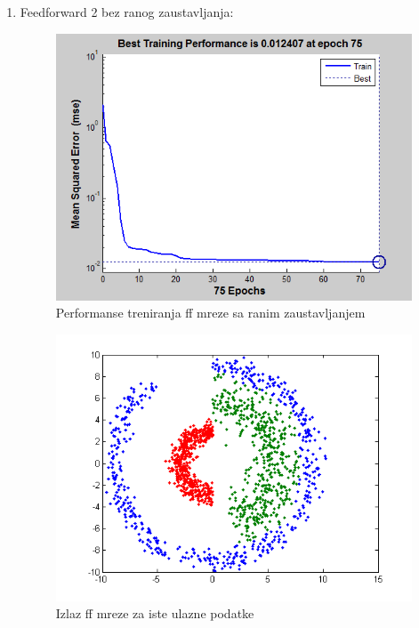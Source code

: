 \documentclass{report}
\begin{document}
\begin{enumerate}
\begin{enumerate}
\newpage
\item\LARGE
Feedforward 2 bez ranog zaustavljanja:\large

\begin{figure}[!h]
\begin{center}
\includegraphics[scale=0.8]{B1performanceFF2.png}
\caption{Performanse treniranja ff mreze sa ranim zaustavljanjem}
\end{center}
\end{figure}

\begin{figure}[!h]
\begin{center}
\includegraphics[scale=0.8]{B1outputFF2Same.png}
\caption{Izlaz ff mreze za iste ulazne podatke}
\end{center}
\end{figure}


\end{enumerate}
\end{enumerate}
\end{document}
